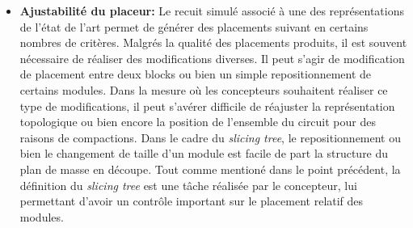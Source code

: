 \begin{itemize}
\item \textbf{Ajustabilité du placeur:} Le recuit simulé associé à une des représentations de l'état de l'art permet de générer des placements suivant en certains nombres de critères. Malgrés la qualité des placements produits, il est souvent nécessaire de réaliser des modifications diverses. Il peut s'agir de modification de placement entre deux blocks ou bien un simple repositionnement de certains modules. Dans la mesure o\`u les concepteurs souhaitent réaliser ce type de modifications, il peut s'avérer difficile de réajuster la représentation topologique ou bien encore la position de l'ensemble du circuit pour des raisons de compactions. Dans le cadre du {\it slicing tree}, le repositionnement ou bien le changement de taille d'un module est facile de part la structure du plan de masse en découpe. Tout comme mentioné dans le point précédent, la définition du {\it slicing tree} est une tâche réalisée par le concepteur, lui permettant d'avoir un contrôle important sur le placement relatif des modules.


\end{itemize}
